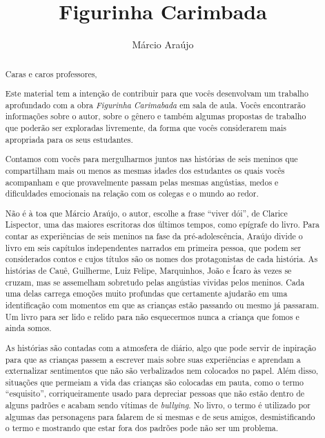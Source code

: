 \documentclass[11pt]{extarticle}
\newcommand{\AutorLivro}{Márcio Araújo}
\newcommand{\TituloLivro}{Figurinha Carimbada}
\newcommand{\colaborador}{Gabriela Karam}
\begin{document}
\title{\TituloLivro}
\author{\AutorLivro}
\def\authornotes{\colaborador}

\date{}
\maketitle


\tableofcontents


\begin{abstract}

Caras e caros professores,

Este material tem a intenção de contribuir para que vocês desenvolvam um trabalho aprofundado com a obra \textit{Figurinha Carimabada} em sala de aula.
Vocês encontrarão informações sobre o autor, sobre o gênero e também 
algumas propostas de trabalho que poderão ser exploradas livremente, 
da forma que vocês considerarem mais apropriada para os seus estudantes.

Contamos com vocês para mergulharmos juntos nas histórias de seis meninos que compartilham mais ou menos as mesmas idades dos estudantes os quais vocês acompanham e que provavelmente passam pelas mesmas angústias, medos e dificuldades emocionais na relação com os colegas e o mundo ao redor. 

Não é à toa que Márcio Araújo, o autor, escolhe a frase ``viver dói'', de Clarice Lispector, uma das maiores escritoras dos últimos tempos, como epígrafe do livro. Para contar as experiências de seis meninos na fase da pré-adolescência, Araújo divide o livro em seis capítulos independentes narrados em primeira pessoa, que podem ser considerados contos e cujos títulos são os nomes dos protagonistas de cada história. As histórias de Cauê, Guilherme, Luiz Felipe, Marquinhos, João e Ícaro às vezes se cruzam, mas se assemelham sobretudo pelas angústias vividas pelos meninos. Cada uma delas carrega emoções muito profundas que certamente ajudarão em uma identificação com momentos em que as crianças estão passando ou mesmo já passaram. Um livro para ser lido e relido para não esquecermos nunca a criança que fomos e ainda somos.

As histórias são contadas com a atmosfera de diário, algo que pode servir de inpiração para que as crianças passem a escrever mais sobre suas experiências e aprendam a externalizar sentimentos que não são verbalizados nem colocados no papel. Além disso, situações que permeiam a vida das crianças são colocadas em pauta, como o termo ``esquisito'', corriqueiramente usado para depreciar pessoas que não estão dentro de alguns padrões e acabam sendo vítimas de \textit{bullying}. No livro, o termo é utilizado por algumas das personagens para falarem de si mesmas e de seus amigos, desmistificando o termo e mostrando que estar fora dos padrões pode não ser um problema. 


\end{abstract}
\end{document}
